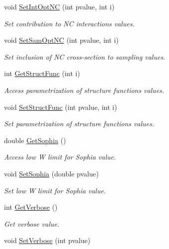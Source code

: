 \begin{DoxyCompactItemize}
void \hyperlink{class_t_djangoh_a867c7f0d6deb79773b4529e496a2ee23}{Set\+Int\+Opt\+NC} (int pvalue, int i)
\begin{DoxyCompactList}\small\item\em Set contribution to NC interactions values. \end{DoxyCompactList}\item 
void \hyperlink{class_t_djangoh_a6e6fa7e1826bd4e86be44d80a6bd6854}{Set\+Sam\+Opt\+NC} (int pvalue, int i)
\begin{DoxyCompactList}\small\item\em Set inclusion of NC cross-\/section to sampling values. \end{DoxyCompactList}\item 
int \hyperlink{class_t_djangoh_a58e1925539d208ca8e00533b5ae52074}{Get\+Struct\+Func} (int i)
\begin{DoxyCompactList}\small\item\em Access parametrization of structure functions values. \end{DoxyCompactList}\item 
void \hyperlink{class_t_djangoh_aa8331885aeb7880a63ebdfcf32919f9b}{Set\+Struct\+Func} (int pvalue, int i)
\begin{DoxyCompactList}\small\item\em Set parametrization of structure functions values. \end{DoxyCompactList}\item 
double \hyperlink{class_t_djangoh_a31acc70811ad58a8986f7d04547e9213}{Get\+Sophia} ()
\begin{DoxyCompactList}\small\item\em Access low W limit for Sophia value. \end{DoxyCompactList}\item 
void \hyperlink{class_t_djangoh_a12bd5515ab5db50b147810e06e98a0b8}{Set\+Sophia} (double pvalue)
\begin{DoxyCompactList}\small\item\em Set low W limit for Sophia value. \end{DoxyCompactList}\item 
int \hyperlink{class_t_djangoh_a1caf80b8f7228dbc7818ac047de9b8b7}{Get\+Verbose} ()
\begin{DoxyCompactList}\small\item\em Get verbose value. \end{DoxyCompactList}\item 
void \hyperlink{class_t_djangoh_a5129257c110777c1625049fb74f33e4b}{Set\+Verbose} (int pvalue)

\end{DoxyCompactItemize}
